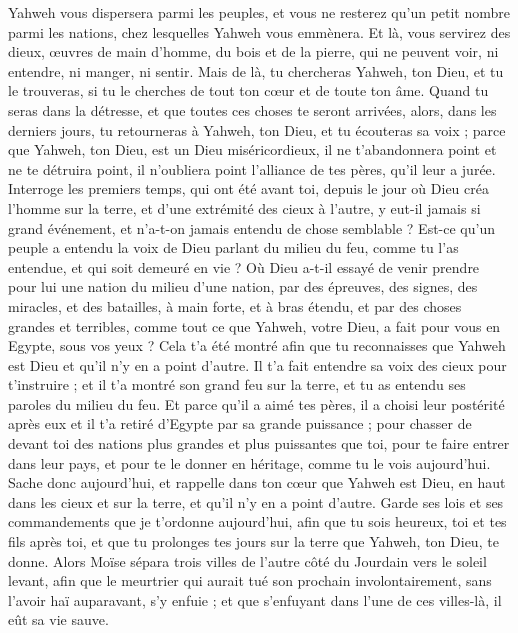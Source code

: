\begin{multicols}{2}
Yahweh vous dispersera parmi les peuples, et vous ne resterez qu'un petit nombre parmi les nations, chez lesquelles Yahweh vous emmènera.
Et là, vous servirez des dieux, œuvres de main d'homme, du bois et de la pierre, qui ne peuvent voir, ni entendre, ni manger, ni sentir.
Mais de là, tu chercheras Yahweh, ton Dieu, et tu le trouveras, si tu le cherches de tout ton cœur et de toute ton âme.
Quand tu seras dans la détresse, et que toutes ces choses te seront arrivées, alors, dans les derniers jours, tu retourneras à Yahweh, ton Dieu, et tu écouteras sa voix ;
parce que Yahweh, ton Dieu, est un Dieu miséricordieux, il ne t'abandonnera point et ne te détruira point, il n'oubliera point l'alliance de tes pères, qu'il leur a jurée.
Interroge les premiers temps, qui ont été avant toi, depuis le jour où Dieu créa l'homme sur la terre, et d’une extrémité des cieux à l’autre, y eut-il jamais si grand événement, et n’a-t-on jamais entendu de chose semblable ?
Est-ce qu’un peuple a entendu la voix de Dieu parlant du milieu du feu, comme tu l'as entendue, et qui soit demeuré en vie ?
Où Dieu a-t-il essayé de venir prendre pour lui une nation du milieu d'une nation, par des épreuves, des signes, des miracles, et des batailles, à main forte, et à bras étendu, et par des choses grandes et terribles, comme tout ce que Yahweh, votre Dieu, a fait pour vous en Egypte, sous vos yeux ?
Cela t’a été montré afin que tu reconnaisses que Yahweh est Dieu et qu'il n'y en a point d'autre.
Il t'a fait entendre sa voix des cieux pour t'instruire ; et il t'a montré son grand feu sur la terre, et tu as entendu ses paroles du milieu du feu.
Et parce qu'il a aimé tes pères, il a choisi leur postérité après eux et il t'a retiré d'Egypte par sa grande puissance ;
pour chasser de devant toi des nations plus grandes et plus puissantes que toi, pour te faire entrer dans leur pays, et pour te le donner en héritage, comme tu le vois aujourd'hui.
Sache donc aujourd'hui, et rappelle dans ton cœur que Yahweh est Dieu, en haut dans les cieux et sur la terre, et qu'il n'y en a point d'autre.
Garde ses lois et ses commandements que je t’ordonne aujourd'hui, afin que tu sois heureux, toi et tes fils après toi, et que tu prolonges tes jours sur la terre que Yahweh, ton Dieu, te donne.
Alors Moïse sépara trois villes de l’autre côté du Jourdain vers le soleil levant,
afin que le meurtrier qui aurait tué son prochain involontairement, sans l'avoir haï auparavant, s'y enfuie ; et que s’enfuyant dans l'une de ces villes-là, il eût sa vie sauve.

\end{multicols}

